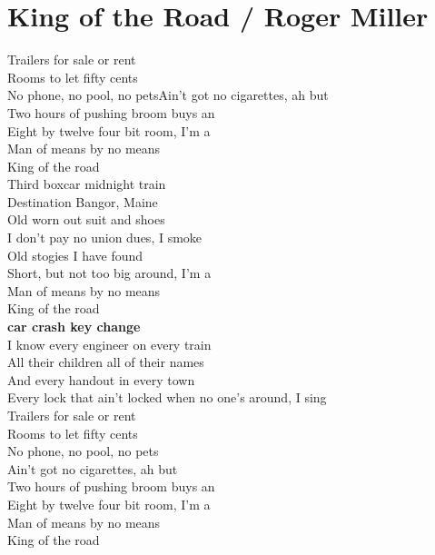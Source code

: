 \section{King of the Road / Roger Miller}\label{sec:kingoftheroad}
\Amajor
\DmajorEasy
\Eseven
\Fmajor
\BflatMajor
\EflatMajor
\Fmajor

Trailers for sale or rent\\
 Rooms to let fifty cents\\
No phone, no pool, no petsAin't got no cigarettes, ah but\\
 Two hours of pushing broom buys an\\
 Eight by twelve four bit room, I'm a\\
Man of means by no means\\
King of the road\\
Third boxcar midnight train\\
 Destination Bangor, Maine\\
Old worn out suit and shoes\\
 I don't pay no union dues, I smoke\\
 Old stogies I have found\\
 Short, but not too big around, I'm a\\
 Man of means by no means\\
 King of the road\\
\textbf{car crash key change}\\
I know every engineer on every train\\
 All their children all of their names\\
And every handout in every town\\
Every lock that ain't locked when no one's around, I sing\\
Trailers for sale or rent\\
 Rooms to let fifty cents\\
No phone, no pool, no pets\\
 Ain't got no cigarettes, ah but\\
Two hours of pushing broom buys an\\
 Eight by twelve four bit room, I'm a\\
Man of means by no means\\
King of the road\\
